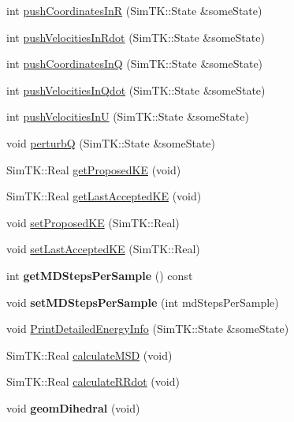 \begin{DoxyCompactItemize}
\item 
int \hyperlink{classHMCSampler_a4c2bd08867d1a07c54587d52fd8d5fed}{push\+Coordinates\+InR} (Sim\+T\+K\+::\+State \&some\+State)
\item 
int \hyperlink{classHMCSampler_a8e67589e5d96c6fe11a20f7bc073af84}{push\+Velocities\+In\+Rdot} (Sim\+T\+K\+::\+State \&some\+State)
\item 
int \hyperlink{classHMCSampler_aa0e27f4d44328dcae4a2a38cf1b3f626}{push\+Coordinates\+InQ} (Sim\+T\+K\+::\+State \&some\+State)
\item 
int \hyperlink{classHMCSampler_a642722a3022575f342c9913ffbb82ce2}{push\+Velocities\+In\+Qdot} (Sim\+T\+K\+::\+State \&some\+State)
\item 
int \hyperlink{classHMCSampler_abcdb1f372e12dabec50d4f674c708461}{push\+Velocities\+InU} (Sim\+T\+K\+::\+State \&some\+State)
\item 
void \hyperlink{classHMCSampler_a4abf0550ceb1ecef10c5823581ebf515}{perturbQ} (Sim\+T\+K\+::\+State \&some\+State)
\item 
Sim\+T\+K\+::\+Real \hyperlink{classHMCSampler_aea854d56098d31f7b2e2d15d231b8949}{get\+Proposed\+KE} (void)
\item 
Sim\+T\+K\+::\+Real \hyperlink{classHMCSampler_a1e3d6ded4ceb757ab402e6ace268fc2b}{get\+Last\+Accepted\+KE} (void)
\item 
void \hyperlink{classHMCSampler_a5972926e31fe4f9ee7ae1498f049f9f1}{set\+Proposed\+KE} (Sim\+T\+K\+::\+Real)
\item 
void \hyperlink{classHMCSampler_a44b541a914af643eaca56e43d5d58a13}{set\+Last\+Accepted\+KE} (Sim\+T\+K\+::\+Real)
\item 
int {\bfseries get\+M\+D\+Steps\+Per\+Sample} () const \hypertarget{classHMCSampler_a8e67512f7f8f3bcfe4a736f8b871703c}{}\label{classHMCSampler_a8e67512f7f8f3bcfe4a736f8b871703c}

\item 
void {\bfseries set\+M\+D\+Steps\+Per\+Sample} (int md\+Steps\+Per\+Sample)\hypertarget{classHMCSampler_a4a65fde374fba7362ef1f3d37f3a79da}{}\label{classHMCSampler_a4a65fde374fba7362ef1f3d37f3a79da}

\item 
void \hyperlink{classHMCSampler_ab0354537f83779a468255e4c5fc2c9b6}{Print\+Detailed\+Energy\+Info} (Sim\+T\+K\+::\+State \&some\+State)
\item 
Sim\+T\+K\+::\+Real \hyperlink{classHMCSampler_a36bce5b70cae7391ff300b0ca834b84f}{calculate\+M\+SD} (void)
\item 
Sim\+T\+K\+::\+Real \hyperlink{classHMCSampler_a9d64c28ce62364363fe7c1ff3baceefa}{calculate\+R\+Rdot} (void)
\item 
void {\bfseries geom\+Dihedral} (void)\hypertarget{classHMCSampler_a9e262ad1a8b9a9d70d6f52d8a638567b}{}\label{classHMCSampler_a9e262ad1a8b9a9d70d6f52d8a638567b}

\end{DoxyCompactItemize}
